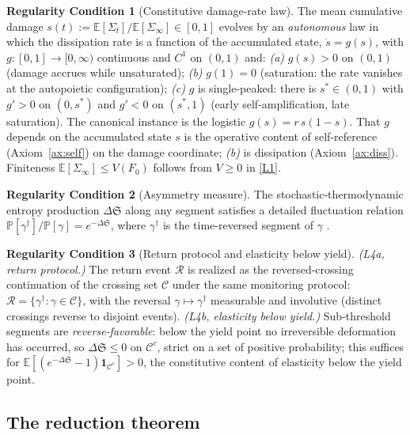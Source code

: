 \documentclass[11pt]{article}
\theoremstyle{plain}
\theoremstyle{definition}
\newtheorem{regularity}{Regularity Condition}
\theoremstyle{remark}
\newcommand{\E}{\mathbb{E}}
\newcommand{\Sep}{\mathfrak{S}}
\begin{document}
\begin{regularity}[Constitutive damage-rate law]\label{L2}
The mean cumulative damage $s(t):=\E[\Sigma_t]/\E[\Sigma_\infty]\in[0,1]$ evolves by an \emph{autonomous} law in which the dissipation rate is a function of the accumulated state, $\dot s=g(s)$, with $g:[0,1]\to[0,\infty)$ continuous and $C^1$ on $(0,1)$ and: \emph{(a)} $g(s)>0$ on $(0,1)$ (damage accrues while unsaturated); \emph{(b)} $g(1)=0$ (saturation: the rate vanishes at the autopoietic configuration); \emph{(c)} $g$ is single-peaked: there is $s^\ast\in(0,1)$ with $g'>0$ on $(0,s^\ast)$ and $g'<0$ on $(s^\ast,1)$ (early self-amplification, late saturation). The canonical instance is the logistic $g(s)=r\,s(1-s)$. That $g$ depends on the accumulated state $s$ is the operative content of self-reference (Axiom~\ref{ax:self}) on the damage coordinate; \emph{(b)} is dissipation (Axiom~\ref{ax:diss}). Finiteness $\E[\Sigma_\infty]\le V(F_0)$ follows from $V\ge0$ in \ref{L1}.
\end{regularity}

\begin{regularity}[Asymmetry measure]\label{L3}
The stochastic-thermodynamic entropy production $\Delta\Sep$ along any segment satisfies a detailed fluctuation relation $\mathbb P[\gamma^{\dagger}]/\mathbb P[\gamma]=e^{-\Delta\Sep}$, where $\gamma^{\dagger}$ is the time-reversed segment of $\gamma$ \citep{crooks1999,seifert2012}.
\end{regularity}

\begin{regularity}[Return protocol and elasticity below yield]\label{L4}
\emph{(L4a, return protocol.)} The return event $\mathcal R$ is realized as the reversed-crossing continuation of the crossing set $\mathcal C$ under the same monitoring protocol: $\mathcal R=\{\gamma^\dagger:\gamma\in\mathcal C\}$, with the reversal $\gamma\mapsto\gamma^\dagger$ measurable and involutive (distinct crossings reverse to disjoint events). \emph{(L4b, elasticity below yield.)} Sub-threshold segments are \emph{reverse-favorable}: below the yield point no irreversible deformation has occurred, so $\Delta\Sep\le0$ on $\mathcal C^c$, strict on a set of positive probability; this suffices for $\E[(e^{-\Delta\Sep}-1)\mathbf 1_{\mathcal C^c}]>0$, the constitutive content of elasticity below the yield point.
\end{regularity}

\subsection{The reduction theorem}
\end{document}
